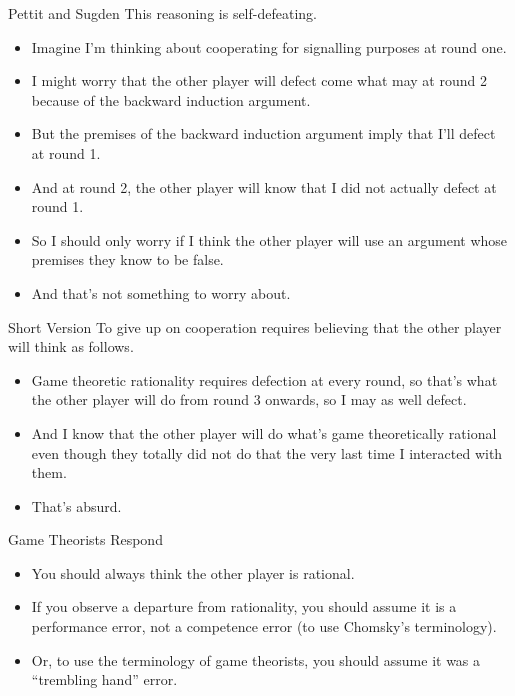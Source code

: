 \documentclass[
  ignorenonframetext,
]{beamer}
\providecommand{\tightlist}{%
  \setlength{\itemsep}{0pt}\setlength{\parskip}{0pt}}
\begin{document}
\begin{frame}{Pettit and Sugden}
\protect\hypertarget{pettit-and-sugden}{}
This reasoning is self-defeating.

\begin{itemize}
\tightlist
\item
  Imagine I'm thinking about cooperating for signalling purposes at
  round one.
\item
  I might worry that the other player will defect come what may at round
  2 because of the backward induction argument.
\item
  But the premises of the backward induction argument imply that I'll
  defect at round 1.
\item
  And at round 2, the other player will know that I did not actually
  defect at round 1.
\item
  So I should only worry if I think the other player will use an
  argument whose premises they know to be false.
\item
  And that's not something to worry about.
\end{itemize}
\end{frame}

\begin{frame}{Short Version}
\protect\hypertarget{short-version}{}
To give up on cooperation requires believing that the other player will
think as follows.

\begin{itemize}
\tightlist
\item
  Game theoretic rationality requires defection at every round, so
  that's what the other player will do from round 3 onwards, so I may as
  well defect.
\item
  And I know that the other player will do what's game theoretically
  rational even though they totally did not do that the very last time I
  interacted with them.
\item
  That's absurd.
\end{itemize}
\end{frame}

\begin{frame}{Game Theorists Respond}
\protect\hypertarget{game-theorists-respond}{}
\begin{itemize}
\tightlist
\item
  You should always think the other player is rational.
\item
  If you observe a departure from rationality, you should assume it is a
  performance error, not a competence error (to use Chomsky's
  terminology).
\item
  Or, to use the terminology of game theorists, you should assume it was
  a ``trembling hand'' error.
\end{itemize}
\end{frame}
\end{document}
